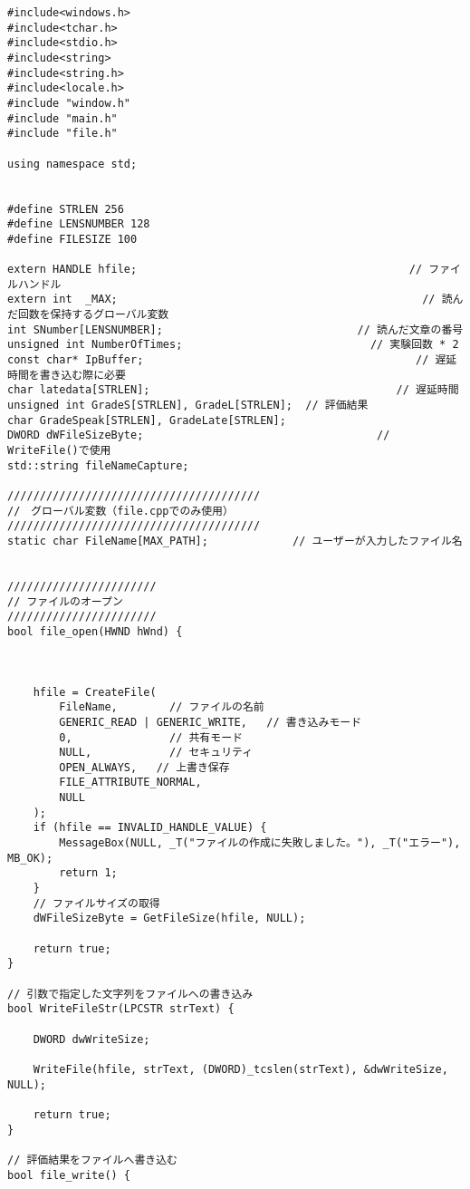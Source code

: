 \begin{lstlisting}[caption=file.cpp]
#include<windows.h>
#include<tchar.h>
#include<stdio.h>
#include<string>
#include<string.h>
#include<locale.h>
#include "window.h"
#include "main.h"
#include "file.h"

using namespace std;


#define STRLEN 256
#define LENSNUMBER 128
#define FILESIZE 100

extern HANDLE hfile;                                          // ファイルハンドル
extern int  _MAX;                                               // 読んだ回数を保持するグローバル変数
int SNumber[LENSNUMBER];                              // 読んだ文章の番号
unsigned int NumberOfTimes;                             // 実験回数 * 2
const char* IpBuffer;                                          // 遅延時間を書き込む際に必要
char latedata[STRLEN];                                      // 遅延時間
unsigned int GradeS[STRLEN], GradeL[STRLEN];  // 評価結果
char GradeSpeak[STRLEN], GradeLate[STRLEN];
DWORD dWFileSizeByte;                                    // WriteFile()で使用
std::string fileNameCapture;

///////////////////////////////////////
//　グローバル変数（file.cppでのみ使用）
///////////////////////////////////////
static char FileName[MAX_PATH];             // ユーザーが入力したファイル名


///////////////////////
// ファイルのオープン
///////////////////////
bool file_open(HWND hWnd) {

	

	hfile = CreateFile(
		FileName,        // ファイルの名前
		GENERIC_READ | GENERIC_WRITE,   // 書き込みモード
		0,               // 共有モード 
		NULL,            // セキュリティ
		OPEN_ALWAYS,   // 上書き保存
		FILE_ATTRIBUTE_NORMAL,
		NULL
	);
	if (hfile == INVALID_HANDLE_VALUE) {
		MessageBox(NULL, _T("ファイルの作成に失敗しました。"), _T("エラー"), MB_OK);
		return 1;
	}
	// ファイルサイズの取得
	dWFileSizeByte = GetFileSize(hfile, NULL);

	return true;
}

// 引数で指定した文字列をファイルへの書き込み
bool WriteFileStr(LPCSTR strText) {

	DWORD dwWriteSize;

	WriteFile(hfile, strText, (DWORD)_tcslen(strText), &dwWriteSize, NULL);

	return true;
}

// 評価結果をファイルへ書き込む
bool file_write() {


\end{lstlisting}
